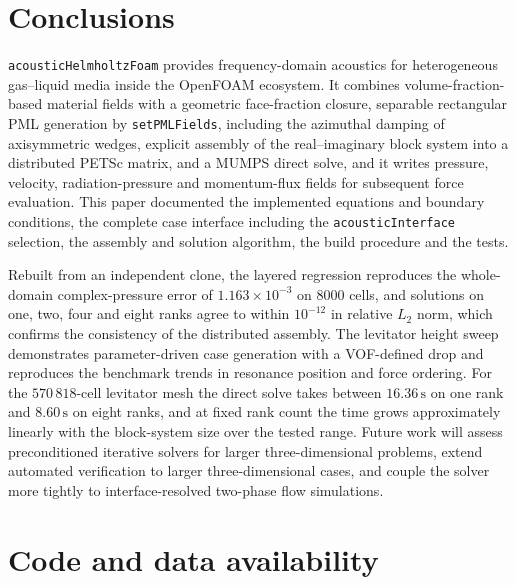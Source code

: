 \documentclass[final,12pt,nopreprintline]{elsarticle}
\newcommand{\code}[1]{\texttt{#1}}
\begin{document}
\section{Conclusions}
\label{sec:conclusions}

\code{acousticHelmholtzFoam} provides frequency-domain acoustics for
heterogeneous gas--liquid media inside the OpenFOAM ecosystem.  It combines
volume-fraction-based material fields with a geometric face-fraction closure,
separable rectangular PML generation by \code{setPMLFields}, including the
azimuthal damping of axisymmetric wedges, explicit assembly
of the real--imaginary block system into a distributed PETSc matrix, and a
MUMPS direct solve, and it writes pressure, velocity, radiation-pressure and
momentum-flux fields for subsequent force evaluation.  This paper documented
the implemented equations and boundary conditions, the complete case
interface including the \code{acousticInterface} selection, the assembly and
solution algorithm, the build procedure and the tests.

Rebuilt from an independent clone, the layered regression reproduces the
whole-domain complex-pressure error of $1.163\times10^{-3}$ on 8000 cells, and
solutions on one, two, four and eight ranks agree to within $10^{-12}$ in
relative $L_2$ norm, which confirms the consistency of the distributed
assembly.  The levitator height sweep
demonstrates parameter-driven case generation with a VOF-defined drop and
reproduces the benchmark trends in resonance position and force ordering.  For
the $570\,818$-cell levitator mesh the direct solve takes between
$16.36\,\mathrm{s}$ on one rank and $8.60\,\mathrm{s}$ on eight ranks, and at
fixed rank count the time grows approximately linearly with the block-system
size over the tested range.  Future work will assess preconditioned iterative
solvers for larger three-dimensional problems, extend automated verification to larger three-dimensional cases,
and couple the solver more tightly to interface-resolved
two-phase flow simulations.

\section*{Code and data availability}
\end{document}
